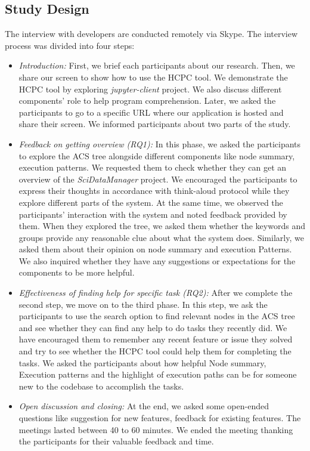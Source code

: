 \subsection{Study Design}
The interview with developers are conducted remotely via Skype. The interview process was divided into four steps:
\begin{itemize}
    \item \emph{Introduction:} First, we brief each participants about our research. Then, we share our screen to show how to use the HCPC tool. We demonstrate the HCPC tool by exploring \emph{jupyter-client} project. We also discuss different components' role to help program comprehension. Later, we asked the participants to go to a specific URL where our application is hosted and share their screen. We informed participants about two parts of the study.  
    
    \item \emph{Feedback on getting overview (RQ1):} In this phase, we asked the participants to explore the ACS tree alongside different components like node summary, execution patterns. We requested them to check whether they can get an  overview of the \emph{SciDataManager} project. We encouraged the participants to express their thoughts in accordance with think-aloud protocol \cite{jaaskelainen2010thinkAloudProtocol, zhou2018identifyingFeaturesForks} while they explore different parts of the system. At the same time, we observed the participants' interaction with the system and noted feedback provided by them. When they explored the tree, we asked them whether the keywords and groups provide any reasonable clue about what the system does. Similarly, we asked them about their opinion on node summary and execution Patterns. We also inquired whether they have any suggestions or expectations for the components to be more helpful.
    
    
    \item \emph{Effectiveness of finding help for specific task (RQ2):} After we complete the second step, we move on to the third phase. In this step, we ask the participants to use the search option to find relevant nodes in the ACS tree and see whether they can find any help to do tasks they recently did. We have encouraged them to remember any recent feature or issue they solved and try to see whether the HCPC tool could help them for completing the tasks. We asked the participants about how helpful Node summary, Execution patterns and the highlight of execution paths can be for someone new to the codebase to accomplish the tasks.
    \item \emph{Open discussion and closing:} At the end, we asked some open-ended questions like suggestion for new features, feedback for existing features. The meetings lasted between 40 to 60 minutes. We ended the meeting thanking the participants for their valuable feedback and time.

\end{itemize}
